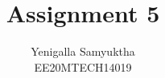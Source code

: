 \documentclass[journal,12pt,twocolumn]{IEEEtran}
\begin{document}
\makeatletter
{}
\makeatother
\let\StandardTheFigure\thefigure
\let\vec\mathbf
\renewcommand{\thefigure}{\theproblem}
\def\putbox#1#2#3{\makebox[0in][l]{\makebox[#1][l]{}\raisebox{\baselineskip}[0in][0in]{\raisebox{#2}[0in][0in]{#3}}}}
     \def\rightbox#1{\makebox[0in][r]{#1}}
     \def\centbox#1{\makebox[0in]{#1}}
     \def\topbox#1{\raisebox{-\baselineskip}[0in][0in]{#1}}
     \def\midbox#1{\raisebox{-0.5\baselineskip}[0in][0in]{#1}}
\vspace{3cm}
\title{Assignment 5}
\author{Yenigalla Samyuktha\\EE20MTECH14019}
%
%
%
% 
%
\end{document}
